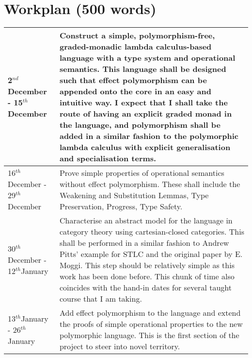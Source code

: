 \documentclass[11pt]{article}
\renewcommand{\th}{$^{th}$}
\newcommand{\nd}{$^{nd}$}
\begin{document}
\section{Workplan (500 words)}

\begin{tabular}{|p{6cm}||p{10cm}|}
\hline
	2\nd December - 15\th December & Construct a simple, polymorphism-free, graded-monadic lambda calculus-based language with a type system and operational semantics. This language shall be designed such that effect polymorphism can be appended onto the core in an easy and intuitive way. I expect that I shall take the route of having an explicit graded monad in the language, and polymorphism shall be added in a similar fashion to the polymorphic lambda calculus with explicit generalisation and specialisation terms.\\\hline
	16\th December - 29\th December & Prove simple properties of operational semantics without effect polymorphism. These shall include the Weakening and Substitution Lemmas, Type Preservation, Progress, Type Safety.\\\hline
	30\th December - 12\th January & Characterise an abstract model for the language in category theory using cartesian-closed categories. This shall be performed in a similar fashion to Andrew Pitts' example for STLC and the original paper by E. Moggi. This step should be relatively simple as this work has been done before. This chunk of time also coincides with the hand-in dates for several taught course that I am taking.  \\\hline
	13\th January - 26\th January &  Add effect polymorphism to the language and extend the proofs of simple operational properties to the new polymorphic language. This is the first section of the project to steer into novel territory. \\\hline
	

\end{tabular}
\end{document}
